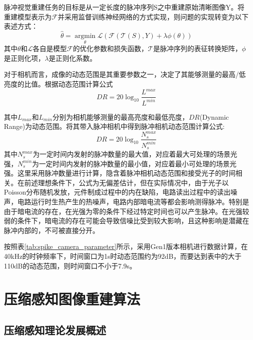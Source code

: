 脉冲视觉重建任务的目标是从一定长度的脉冲序列S之中重建原始清晰图像Y。将重建模型表示为$\mathcal{F}$并采用监督训练神经网络的方式实现，则问题的实现转变为以下表述方式：
\begin{equation}
  \label{eq:3}
  \hat{\theta} = \mathop{\arg\min}\limits_{\theta} \mathcal{L}(\mathcal{F}(\mathcal{T}(S),Y) + \lambda \phi(\theta))
\end{equation}
其中$\theta$和$\mathcal{L}$各自是模型$\mathcal{F}$的优化参数和损失函数，$\mathcal{T}$是脉冲序列的表征转换矩阵，$\phi$是正则化项，$\lambda$是正则化系数。

对于相机而言，成像的动态范围是其重要参数之一，决定了其能够测量的最高/低亮度的比值。根据动态范围计算公式
\begin{equation}
  \label{eq:7}
  DR = 20 \log_{10} \frac{L^{max}}{L^{min}}
\end{equation}

其中$L_{max}$和$L_{min}$分别为相机能够测量的最高亮度和最低亮度，$DR$(Dynamic Range)为动态范围。将其带入脉冲相机中得到脉冲相机动态范围计算公式:
\begin{equation}
  \label{eq:8}
  DR = 20 \log_{10} \frac{N^{max}_s}{N^{min}_s}
\end{equation}
其中$N^{max}_s$为一定时间内发射的脉冲数量的最大值，对应着最大可处理的场景光强，$N^{min}_s$为一定时间内发射的脉冲数量的最小值，对应着最小可处理的场景光强。这里采用脉冲数量进行计算，隐含着脉冲相机动态范围和接受光子的时间相关。在前述理想条件下，公式为无偏差估计，但在实际情况中，由于光子以Poisson分布随机发放，元件制成过程中的内在缺陷，电路读出过程中的读出噪声，电路运行时生热产生的热噪声，电路内部暗电流等都会影响测得脉冲。特别是由于暗电流的存在，在光强为零的条件下经过特定时间也可以产生脉冲。在光强较弱的条件下，暗电流的存在可能会导致信噪比受到较大影响，且这种影响是潜藏在脉冲内部的，不可被直接分开。

按照表\ref{tab:spike_camera_parameter}所示，采用Gen1版本相机进行数据计算，在40kHz的时钟频率下，时间窗口为1s时动态范围约为92dB，而要达到表中的大于110dB的动态范围，则时间窗口不小于7.9s。


\section{压缩感知图像重建算法}
\subsection{压缩感知理论发展概述}

